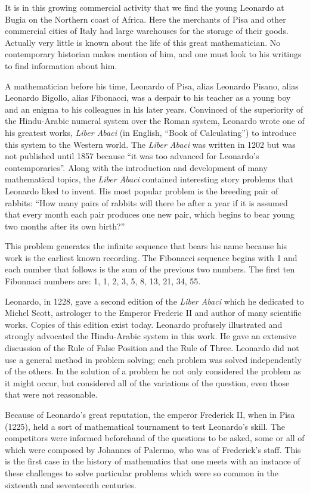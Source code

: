 \documentclass[10pt,letter]{article}
\begin{document}
It is in this growing commercial activity that we find the young
Leonardo at Bugia on the Northern coast of Africa. Here the merchants of
Pisa and other commercial cities of Italy had large warehouses for the
storage of their goods. Actually very little is known about the life of
this great mathematician. No contemporary historian makes mention of
him, and one must look to his writings to find information about him.

A mathematician before his time, Leonardo of Pisa, alias Leonardo
Pisano, alias Leonardo Bigollo, alias Fibonacci, was a despair to his
teacher as a young boy and an enigma to his colleagues in his later
years. Convinced of the superiority of the Hindu-Arabic numeral system
over the Roman system, Leonardo wrote one of his greatest works,
\emph{Liber Abaci} (in English, ``Book of Calculating'') to introduce
this system to the Western world. The \emph{Liber Abaci} was written in
1202 but was not published until 1857 because ``it was too advanced for
Leonardo's contemporaries''. Along with the introduction and development
of many mathematical topics, the \emph{Liber Abaci} contained
interesting story problems that Leonardo liked to invent. His most
popular problem is the breeding pair of rabbits: ``How many pairs of
rabbits will there be after a year if it is assumed that every month
each pair produces one new pair, which begins to bear young two months
after its own birth?''

This problem generates the infinite sequence that bears his name because
his work is the earliest known recording. The Fibonacci sequence begins
with 1 and each number that follows is the sum of the previous two
numbers. The first ten Fibonnaci numbers are: 1, 1, 2, 3, 5, 8, 13, 21,
34, 55.

Leonardo, in 1228, gave a second edition of the \emph{Liber Abaci} which
he dedicated to Michel Scott, astrologer to the Emperor Frederic II and
author of many scientific works. Copies of this edition exist today.
Leonardo profusely illustrated and strongly advocated the Hindu-Arabic
system in this work. He gave an extensive discussion of the Rule of
False Position and the Rule of Three. Leonardo did not use a general
method in problem solving; each problem was solved independently of the
others. In the solution of a problem he not only considered the problem
as it might occur, but considered all of the variations of the question,
even those that were not reasonable.

Because of Leonardo's great reputation, the emperor Frederick II, when
in Pisa (1225), held a sort of mathematical tournament to test
Leonardo's skill. The competitors were informed beforehand of the
questions to be asked, some or all of which were composed by Johannes of
Palermo, who was of Frederick's staff. This is the first case in the
history of mathematics that one meets with an instance of these
challenges to solve particular problems which were so common in the
sixteenth and seventeenth centuries.
\end{document}
